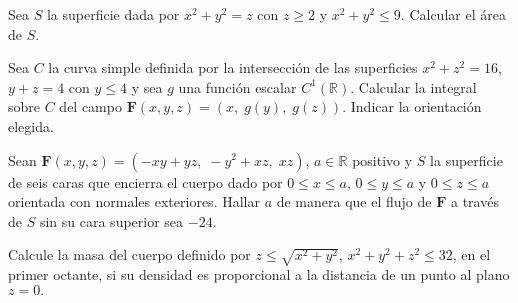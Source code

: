 
\begin{question}
  Sea  $S$  la superficie dada por $x^{2}+ y^{2} = z$ con $z \geq 2$  y $x^{2}+ y^{2} \leq 9.$  Calcular el \'area de $S.$
\end{question}


\begin{question}
  Sea $C$ la curva simple definida por la intersecci\'on de las superficies $x^{2}+z^{2}=16$,  $y+z=4$ con $y\leq 4$ y sea $g$ una funci\'on escalar $C^{1}(\mathbb{R})$. Calcular la integral sobre $C$ del campo $\mathbf{F}(x,y,z)=(x,\;g(y),\;g(z)).$ Indicar la orientaci\'on elegida.
\end{question}


\begin{question}
  Sean $\mathbf{F}(x,y,z)=(-xy+yz,\;-y^{2}+xz,\; xz)$, $a \in \mathbb{R}$ positivo  y $S$ la superficie de seis caras que encierra el cuerpo dado por $0\leq x \leq  a$, $0 \leq  y \leq  a $ y  $0 \leq  z \leq a$ orientada con normales exteriores.   Hallar $a$ de manera que el flujo de $\mathbf{F}$ a trav\'es  de $S$ sin su cara superior sea $-24$.
\end{question}


\begin{question}
  Calcule la masa del cuerpo definido por $z\leq \sqrt{x^{2} + y^{2} }$,  $x^{2} + y^{2} + z^{2} \leq 32$,  en el primer octante, si su densidad es proporcional a la distancia de un  punto al plano $z=0.$
\end{question}

\newpage



